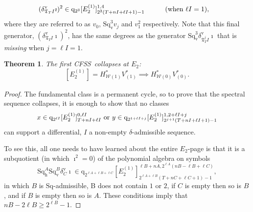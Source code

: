 \documentclass[11pt]{amsart} \renewcommand{\baselinestretch}{1.2}
\theoremstyle{plain}
\newtheorem{thm}{Theorem}[section] %
\numberwithin{equation}{section} %
\theoremstyle{plain}
\newtheorem{thm}{Theorem}[chapter] %
\numberwithin{equation}{chapter} %
\newcommand{\calw}{\mathcal{W}}
\newcommand{\quadgrad}[1]{\mathrm{q}_{#1}}
\newcommand{\Sq}{\mathrm{Sq}}
\newcommand{\TOP}{\mathfrak{T}}
\newcommand{\E}[5]{[E^{#1}_{#2}#3]^{#4}_{#5}}
\newcommand{\uver}{^\mathrm{v}}
\newcommand{\dver}{_\mathrm{v}}
\newcommand{\dhor}{_\mathrm{h}}
\newcommand{\Sqh}{\mathrm{Sq}\dhor}
\newcommand{\Sqv}{\mathrm{Sq}\dver}
\newcommand{\deltav}{\delta\uver}
\newcommand{\CFSS}{CFSS}
\begin{document}
\begin{Calculations of HWn}
\begin{alignat}{2}
(\deltav_{\TOP_T I}\imath)^{2}&\in 
\quadgrad{2^{3}}\E{(1)}{2}{}{1,4}{2^{2}(T+nI+\ell I+1)-1}
&\qquad&\textup{(when $\ell I=1$)},
\label{last generator}
\end{alignat}
where they are referred to  as $v_0$, $\Sqv^3v_j$ and $v_1^2$ respectively.
Note that this final generator, $(\deltav_{\TOP_T I}\imath)^{2}$, has the same degrees as the generator $\Sqv^{3}\deltav_{\TOP_T^j\!I}\imath$ that is \emph{missing} when $j=\ell I=1$.
\begin{thm}
The first \CFSS\ collapses at $E_2$:
\[\E{(1)}{2}{}{}{}=H^*_{\calw(1)}V^*_{(1)}\implies H^*_{\calw(0)}V^*_{(0)}.\]
\end{thm}
\begin{proof}
The fundamental class is a permanent cycle, so to prove that the spectral sequence collapses, it is enough to show that no classes
\[x\in \quadgrad{2^{\ell I}}\E{(1)}{2}{}{0,\ell I}{T+nI+\ell I}\textup{ or }y\in \quadgrad{2^{1+\ell I+j}}\E{(1)}{2}{}{1,2+\ell I+j}{2^{j+1}(T+nI+\ell I+1)-1}\]
can support a differential, $I$ a non-empty $\delta$-admissible sequence.

To see this, all one needs to have learned about the entire $E_2$-page is that it is a subquotient (in which $\imath^2=0$) of the polynomial algebra on symbols
\[\Sqh^A\Sqv^B\deltav_C\imath\in \quadgrad{2^{\ell A+\ell B+\ell C}}\E{(1)}{2}{}{\ell B+nA,2^{\ell A}(nB-\ell B+\ell C)}{2^{\ell A+\ell B}(T+nC+\ell C+1)-1},\]
in which $B$ is $\Sq$-admissible, B does not contain $1$ or $2$, if $C$ is empty then so is $B$, and if $B$ is empty then so is $A$. These conditions imply that $nB-2\ell B\geq2^{\ell B}-1$.  %


\end{proof}
\end{Calculations of HWn}
\end{document}
